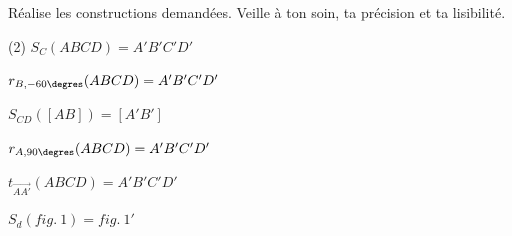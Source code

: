 \documentclass[../math2.tex]{subfiles}
\begin{document}
\newpage
\begin{exercise}
    Réalise les constructions demandées. Veille à ton soin, ta précision et ta lisibilité.
    \begin{tasks}[after-item-skip=2cm](2)
        \task \(S_{C}(ABCD)=A'B'C'D'\)
        \begin{center}
            \tikzspace
            
            \tikzspace
        \end{center}

        \task \(r_{B,-60\degres}(ABCD)=A'B'C'D'\)
        \begin{center}
            \tikzspace
            
            \tikzspace
        \end{center}

        \task \(S_{CD}([AB])=[A'B']\)
        \begin{center}
            \tikzspace
            
            \tikzspace
        \end{center}

        \task \(r_{A,90\degres}(ABCD)=A'B'C'D'\)
        \begin{center}
            \tikzspace
            
            \tikzspace
        \end{center}

        \task \(t_{\overrightarrow{AA'}}(ABCD)=A'B'C'D'\)
        \begin{center}
            \tikzspace
            
            \tikzspace
        \end{center}

        \task \(S_{d}(fig.~1)=fig.~1'\)
        \begin{center}
            \tikzspace
            
            \tikzspace
        \end{center}
    \end{tasks}

\end{exercise}
\end{document}
